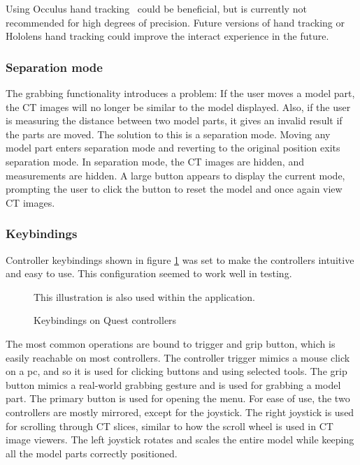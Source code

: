 \documentclass[a4paper]{report}
\begin{document}
Using Occulus hand tracking~\cite{noauthor_set_nodate} could be beneficial, but is currently not recommended for high degrees of precision. Future versions of hand tracking or Hololens hand tracking could improve the interact experience in the future.


\subsubsection{Separation mode}
The grabbing functionality introduces a problem: If the user moves a model part, the CT images will no longer be similar to the model displayed. Also, if the user is measuring the distance between two model parts, it gives an invalid result if the parts are moved. 
The solution to this is a separation mode. Moving any model part enters separation mode and reverting to the original position exits separation mode. In separation mode, the CT images are hidden, and measurements are hidden. A large button appears to display the current mode, prompting the user to click the button to reset the model and once again view CT images.

\subsubsection{Keybindings}
Controller keybindings shown in figure \ref{controllers} was set to make the controllers intuitive and easy to use. This configuration seemed to work well in testing.

\begin{figure}[h!]
    \centering
	\hfill
	\caption{Keybindings on Quest controllers}\label{controllers}
  \small
  This illustration is also used within the application.
\end{figure}

The most common operations are bound to trigger and grip button, which is easily reachable on most controllers. The controller trigger mimics a mouse click on a pc, and so it is used for clicking buttons and using selected tools. The grip button mimics a real-world grabbing gesture and is used for grabbing a model part.
The primary button is used for opening the menu.
For ease of use, the two controllers are mostly mirrored, except for the joystick. The right joystick is used for scrolling through CT slices, similar to how the scroll wheel is used in CT image viewers. The left joystick rotates and scales the entire model while keeping all the model parts correctly positioned.
\end{document}
